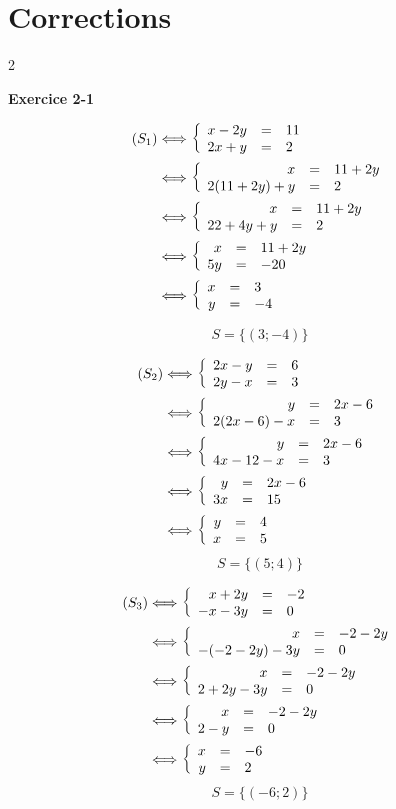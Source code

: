 \documentclass[10pt,a4paper,openany,twoside, eleve]{book}
\begin{document}
\newpage
\section*{Corrections}
\begin{multicols}{2}
	\raggedcolumns

\bfseries Exercice 2-1

\begin{align*}
   (S_1)
   &\Longleftrightarrow \left\{\begin{array}{rcl} x - 2y&=&11 \\ 2x + y&=&2 \end{array}\right.  \\
   &\Longleftrightarrow \left\{\begin{array}{rcl} x&=&11 + 2y \\ 2(11 + 2y) + y&=&2 \end{array}\right. \\
   &\Longleftrightarrow \left\{\begin{array}{rcl} x&=&11 + 2y \\ 22 + 4y + y&=&2 \end{array}\right.  \\
   &\Longleftrightarrow \left\{\begin{array}{rcl} x&=&11 + 2y \\ 5y&=&-20 \end{array}\right. \\
   &\Longleftrightarrow \left\{\begin{array}{rcl}  x&=&3 \\ y&=&-4 \end{array}\right.
   \end{align*}

   $$S = \{ (3;-4) \}$$

\begin{align*}
   (S_2)
   &\Longleftrightarrow \left\{\begin{array}{rcl} 2x - y&=&6 \\ 2y - x&=&3 \end{array}\right. \\
   &\Longleftrightarrow \left\{\begin{array}{rcl} y&=&2x - 6 \\ 2(2x - 6) - x&=&3 \end{array}\right. \\
   &\Longleftrightarrow \left\{\begin{array}{rcl} y&=&2x - 6 \\ 4x - 12 - x&=&3 \end{array}\right. \\
   &\Longleftrightarrow \left\{\begin{array}{rcl} y&=&2x - 6 \\ 3x&=&15 \end{array}\right. \\
   &\Longleftrightarrow \left\{\begin{array}{rcl} y&=&4 \\ x&=&5 \\  \end{array}\right.
   \end{align*}
   $$S = \{ (5;4) \}$$

\begin{align*}
   (S_3)
   &\Longleftrightarrow \left\{\begin{array}{rcl} x + 2y&=&-2 \\ -x - 3y&=&0 \end{array}\right. \\
   &\Longleftrightarrow \left\{\begin{array}{rcl} x&=&-2 - 2y \\ -(-2 - 2y) - 3y&=&0 \end{array}\right. \\
   &\Longleftrightarrow \left\{\begin{array}{rcl} x&=&-2 - 2y \\ 2 + 2y - 3y&=&0 \end{array}\right. \\
   &\Longleftrightarrow \left\{\begin{array}{rcl} x&=&-2 - 2y \\ 2 - y&=&0 \end{array}\right. \\
   &\Longleftrightarrow \left\{\begin{array}{rcl} x&=&-6 \\ y&=&2 \end{array}\right.
   \end{align*}
   $$S = \{ (-6;2) \}$$


\end{multicols}
\end{document}
